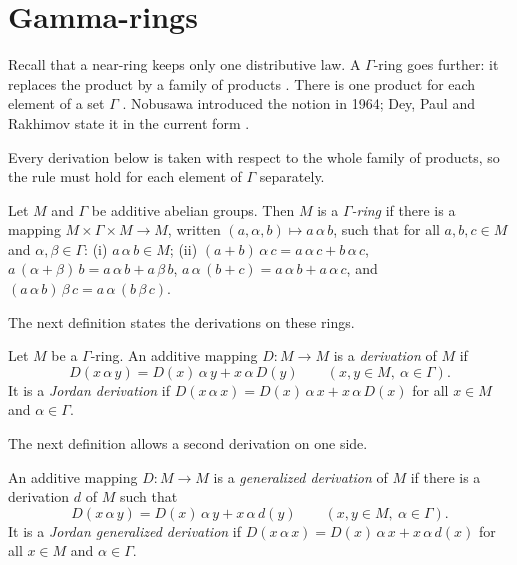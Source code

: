 \section{Gamma-rings}\label{sec:other-systems:gamma-rings}

Recall that a near-ring keeps only one distributive law.
A $\Gamma$-ring goes further: it replaces the product by a family of
products \cite[p.~2]{DeyPaulRakhimov2012}. There is one product for each
element of a set $\Gamma$ \cite[p.~2]{DeyPaulRakhimov2012}. Nobusawa
introduced the
notion in 1964; Dey, Paul and Rakhimov state it in the current form
\cite[p.~2]{DeyPaulRakhimov2012}.

Every derivation below is taken with respect to the whole family of products, so the rule must hold for each element of $\Gamma$ separately.

\begin{definition}\label{def:other:gamma-ring}
Let $M$ and $\Gamma$ be additive abelian groups. Then $M$ is a
\emph{$\Gamma$-ring} if there is a mapping
$M \times \Gamma \times M \to M$, written $(a, \alpha, b) \mapsto a\,\alpha\,b$,
such that for all $a, b, c \in M$ and $\alpha, \beta \in \Gamma$:
\textup{(i)} $a\,\alpha\,b \in M$; \textup{(ii)}
$(a+b)\,\alpha\,c = a\,\alpha\,c + b\,\alpha\,c$,
$a\,(\alpha+\beta)\,b = a\,\alpha\,b + a\,\beta\,b$,
$a\,\alpha\,(b+c) = a\,\alpha\,b + a\,\alpha\,c$, and
$(a\,\alpha\,b)\,\beta\,c = a\,\alpha\,(b\,\beta\,c)$.
\end{definition}

The next definition states the derivations on these rings.

\begin{definition}\label{def:other:gamma-derivation}
Let $M$ be a $\Gamma$-ring. An additive mapping $D \colon M \to M$ is a
\emph{derivation} of $M$ if
\[
D(x\,\alpha\,y) = D(x)\,\alpha\,y + x\,\alpha\,D(y)
\qquad (x, y \in M,\ \alpha \in \Gamma).
\]
It is a \emph{Jordan derivation} if
$D(x\,\alpha\,x) = D(x)\,\alpha\,x + x\,\alpha\,D(x)$ for all $x \in M$
and $\alpha \in \Gamma$.
\end{definition}

The next definition allows a second derivation on one side.

\begin{definition}\label{def:other:gamma-generalized}
An additive mapping $D \colon M \to M$ is a \emph{generalized derivation}
of $M$ if there is a derivation $d$ of $M$ such that
\[
D(x\,\alpha\,y) = D(x)\,\alpha\,y + x\,\alpha\,d(y)
\qquad (x, y \in M,\ \alpha \in \Gamma).
\]
It is a \emph{Jordan generalized derivation} if
$D(x\,\alpha\,x) = D(x)\,\alpha\,x + x\,\alpha\,d(x)$ for all $x \in M$
and $\alpha \in \Gamma$.
\end{definition}

